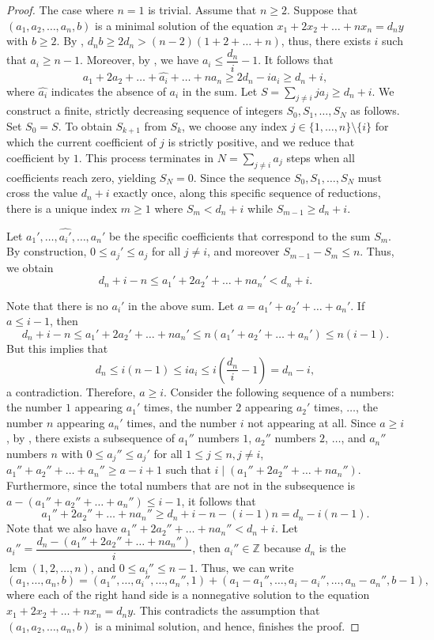 \documentclass[10pt,a4paper]{amsart}
\newcommand{\ZZ}{{\mathbb Z}}
\DeclareMathOperator{\lcm}{lcm}
\begin{document}
\begin{proof}
    The case where $n=1$ is trivial. Assume that $n\ge 2$. Suppose that $(a_1,a_2,\ldots ,a_n,b)$ is a minimal solution of the equation $x_1+2x_2+\ldots +nx_n=d_ny$ with $b\ge 2$. By , $d_nb \ge 2d_n > (n-2)(1+2+\ldots +n)$, thus, there exists $i$ such that $a_i\ge n-1$. Moreover, by , we have $a_i \le \dfrac{d_n}{i}-1$. It follows that 
    \[
    a_1+2a_2 +\ldots + \widehat{a_i} + \ldots +na_n \ge 2d_n - ia_i \ge d_n +i,
    \]
    where $\widehat{a_i}$ indicates the absence of $a_i$ in the sum. Let $S = \sum_{j \ne i} j a_j \ge d_n + i$. We construct a finite, strictly decreasing sequence of integers $S_0, S_1, \ldots, S_N$ as follows. Set $S_0 = S$. To obtain $S_{k+1}$ from $S_k$, we choose any index $j \in \{1, \ldots, n\} \setminus \{i\}$ for which the current coefficient of $j$ is strictly positive, and we reduce that coefficient by $1$. This process terminates in $N = \sum_{j \ne i} a_j$ steps when all coefficients reach zero, yielding $S_N = 0$. Since the sequence $S_0, S_1, \ldots, S_N$ must cross the value $d_n + i$ exactly once, along this specific sequence of reductions, there is a unique index $m \ge 1$ where $S_m < d_n + i$ while $S_{m-1} \ge d_n + i$.

    Let $a_1', \dots, \widehat{a_i'}, \dots, a_n'$ be the specific coefficients that correspond to the sum $S_m$. By construction, $0 \le a_j' \le a_j$ for all $j \ne i$, and moreover $S_{m-1} - S_m \le n$. Thus, we obtain
    \[
    d_n+i-n \le a_1'+2a_2'+\ldots + na_n' < d_n + i.
    \]

    Note that there is no $a_i'$ in the above sum. Let $a=a_1'+a_2'+\ldots +a_n'$. If $a\le i-1$, then
    \[
    d_n+i-n \le a_1'+2a_2'+\ldots + na_n'\le n(a_1'+a_2'+\ldots +a_n')\le n(i-1).
    \]
    But this implies that
    \[
    d_n \le i(n-1) \le ia_i \le i\left(\dfrac{d_n}{i}-1 \right) = d_n-i,
    \]
    a contradiction. Therefore, $a\ge i$. Consider the following sequence of a numbers: the number $1$ appearing $a_1'$ times, the number $2$ appearing $a_2'$ times, $\ldots$, the number $n$ appearing $a_n'$ times, and the number $i$ not appearing at all. Since $a\ge i$, by , there exists a subsequence of $a_1''$ numbers $1$, $a_2''$ numbers $2$, $\ldots$, and $a_n''$ numbers $n$ with $0\le a_j''\le a_j'$ for all $1\le j \le n, j\ne i$, $a_1''+a_2''+\ldots+ a_n'' \ge a-i+1$ such that $i \mid (a_1''+2a_2''+ \ldots+ na_n'')$. Furthermore, since the total numbers that are not in the subsequence is $a-(a_1''+a_2''+ \ldots+ a_n'') \le i-1$, it follows that
    \[
    a_1''+2a_2''+ \ldots+ na_n'' \ge d_n+i-n - (i-1)n =  d_n-i(n-1). 
    \]
    Note that we also have $a_1''+2a_2''+ \ldots+ na_n'' < d_n+i$. Let $a_i''=\dfrac{d_n-(a_1''+2a_2''+ \ldots+ na_n'')}{i}$, then $a_i'' \in \ZZ$ because $d_n$ is the $\lcm(1,2,\ldots,n)$, and $0 \le a_i'' \le n-1$. Thus, we can write
    $$(a_1,\ldots ,a_n,b) = (a_1'',\ldots, a_i'', \ldots,a_n'',1)+(a_1-a_1'',\ldots, a_i-a_i'', \ldots, a_n-a_n'',b-1),$$
    where each of the right hand side is a nonnegative solution to the equation $x_1+2x_2+\ldots +nx_n=d_ny$. This contradicts the assumption that $(a_1,a_2,\ldots ,a_n,b)$ is a minimal solution, and hence, finishes the proof.    
\end{proof}
\end{document}
